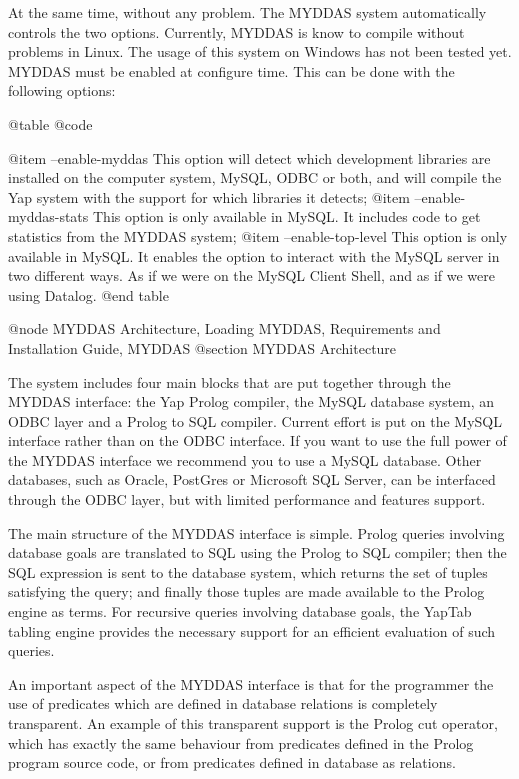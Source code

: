 {{{{{{{{At the same time, without any problem. The MYDDAS system automatically
controls the two options. Currently, MYDDAS is know to compile without
problems in Linux. The usage of this system on Windows has not been
tested yet.  MYDDAS must be enabled at configure time. This can be done
with the following options: 

@table @code

@item --enable-myddas
 This option will detect which development libraries are installed on the computer system, MySQL, ODBC or both, and will compile the Yap system with the support for which libraries it detects;
@item  --enable-myddas-stats
This option is only available in MySQL. It includes code to get
statistics from the MYDDAS system;
@item  --enable-top-level
This option is only available in MySQL.  It enables the option to interact with the MySQL server in
two different ways. As if we were on the MySQL Client Shell, and as if
we were using Datalog. 
@end table

@node MYDDAS Architecture, Loading MYDDAS, Requirements and Installation Guide, MYDDAS
@section MYDDAS Architecture

The system includes four main blocks that are put together through the
MYDDAS interface: the Yap Prolog compiler, the MySQL database system, an
ODBC layer and a Prolog to SQL compiler. Current effort is put on the
MySQL interface rather than on the ODBC interface. If you want to use
the full power of the MYDDAS interface we recommend you to use a MySQL
database. Other databases, such as Oracle, PostGres or Microsoft SQL
Server, can be interfaced through the ODBC layer, but with limited
performance and features support.  

The main structure of the MYDDAS interface is simple. Prolog queries
involving database goals are translated to SQL using the Prolog to SQL
compiler; then the SQL expression is sent to the database system, which
returns the set of tuples satisfying the query; and finally those tuples
are made available to the Prolog engine as terms. For recursive queries
involving database goals, the YapTab tabling engine provides the
necessary support for an efficient evaluation of such queries.

An important aspect of the MYDDAS interface is that for the programmer
the use of predicates which are defined in database relations is
completely transparent. An example of this transparent support is the
Prolog cut operator, which has exactly the same behaviour from
predicates defined in the Prolog program source code, or from predicates
defined in database as relations.

}}}}}}}}
